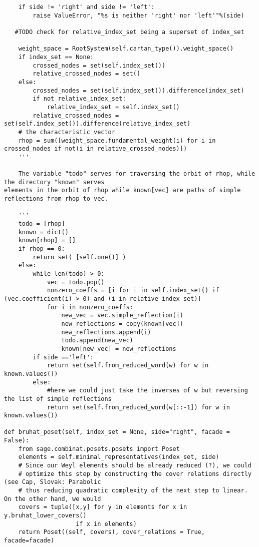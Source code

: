\begin{verbatim}
    if side != 'right' and side != 'left':
        raise ValueError, "%s is neither 'right' nor 'left'"%(side)

   #TODO check for relative_index_set being a superset of index_set

    weight_space = RootSystem(self.cartan_type()).weight_space()
    if index_set == None:
        crossed_nodes = set(self.index_set())
        relative_crossed_nodes = set()
    else:
        crossed_nodes = set(self.index_set()).difference(index_set)
        if not relative_index_set:
            relative_index_set = self.index_set()
        relative_crossed_nodes = set(self.index_set()).difference(relative_index_set)
    # the characteristic vector
    rhop = sum([weight_space.fundamental_weight(i) for i in crossed_nodes if not(i in relative_crossed_nodes)])
    '''

    The variable "todo" serves for traversing the orbit of rhop, while the directory "known" serves
elements in the orbit of rhop while known[vec] are paths of simple reflections from rhop to vec.

    '''
    todo = [rhop]
    known = dict()
    known[rhop] = []
    if rhop == 0:
        return set( [self.one()] )
    else:
        while len(todo) > 0:
            vec = todo.pop()
            nonzero_coeffs = [i for i in self.index_set() if (vec.coefficient(i) > 0) and (i in relative_index_set)]
            for i in nonzero_coeffs:
                new_vec = vec.simple_reflection(i)
                new_reflections = copy(known[vec])
                new_reflections.append(i)
                todo.append(new_vec)
                known[new_vec] = new_reflections
        if side =='left':
            return set(self.from_reduced_word(w) for w in known.values())
        else:
            #here we could just take the inverses of w but reversing the list of simple reflections
            return set(self.from_reduced_word(w[::-1]) for w in known.values())

def bruhat_poset(self, index_set = None, side="right", facade = False):
    from sage.combinat.posets.posets import Poset
    elements = self.minimal_representatives(index_set, side)
    # Since our Weyl elements should be already reduced (?), we could
    # optimize this step by constructing the cover relations directly (see Cap, Slovak: Parabolic
    # thus reducing quadratic complexity of the next step to linear. On the other hand, we would
    covers = tuple([x,y] for y in elements for x in  y.bruhat_lower_covers()
                    if x in elements)
    return Poset((self, covers), cover_relations = True, facade=facade)



\end{verbatim}
